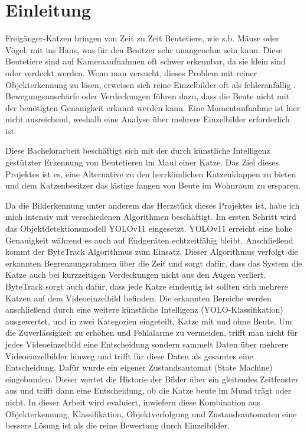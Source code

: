 \chapter{Einleitung}
\label{sec:einleitung}

Freigänger-Katzen bringen von Zeit zu Zeit Beutetiere, wie z.b. Mäuse oder Vögel, mit ins Haus, was für den Besitzer sehr unangenehm sein kann. Diese Beutetiere sind auf Kameraaufnahmen oft schwer erkennbar, da sie klein sind oder verdeckt werden. Wenn man versucht, dieses Problem mit reiner Objekterkennung zu lösen, erweisen sich reine Einzelbilder oft als fehleranfällig \cite{jiao2022video}. Bewegungsunschärfe oder Verdeckungen führen dazu, dass die Beute nicht mit der benötigten Genauigkeit erkannt werden kann. Eine Momentaufnahme ist hier nicht ausreichend, weshalb eine Analyse über mehrere Einzelbilder erforderlich ist.

Diese Bachelorarbeit beschäftigt sich mit der durch künstliche Intelligenz gestützter Erkennung von Beutetieren im Maul einer Katze. Das Ziel dieses Projektes ist es, eine Alternative zu den herrkömlichen Katzenklappen zu bieten und dem Katzenbesitzer das lästige fangen von Beute im Wohnraum zu ersparen.

Da die Bilderkennung unter anderem das Herzstück dieses Projektes ist, habe ich mich intensiv mit verschiedenen Algorithmen beschäftigt. Im ersten Schritt wird das Objektdetektionsmodell YOLOv11 \cite{jocher2024yolo} eingesetzt. YOLOv11 erreicht eine hohe Genauigkeit während es auch auf Endgeräten echtzeitfähig bleibt. Anschließend kommt der ByteTrack \cite{zhang2022bytetrack} Algorithmus zum Einsatz. Dieser Algorithmus verfolgt die erkannten Begrenzungsrahmen über die Zeit und sorgt dafür, dass das System die Katze auch bei kurzzeitigen Verdeckungen nicht aus den Augen verliert. ByteTrack sorgt auch dafür, dass jede Katze eindeutig ist sollten sich mehrere Katzen auf dem Videoeinzelbild befinden. Die erkannten Bereiche werden anschließend durch eine weitere künstliche Intelligenz (YOLO-Klassifikation) ausgewertet, und in zwei Kategorien eingeteilt, Katze mit und ohne Beute. Um die Zuverlässigkeit zu erhöhen und Fehlalarme zu vermeiden, trifft man nicht für jedes Videoeinzelbild eine Entscheidung sondern sammelt Daten über mehrere Videoeinzelbilder hinweg und trifft für diese Daten als gesamtes eine Entscheidung. Dafür wurde ein eigener Zustandsautomat (State Machine) eingebunden. Dieser wertet die Historie der Bilder über ein gleitendes Zeitfenster aus und trifft dann eine Entscheidung, ob die Katze beute im Mund trägt oder nicht. In dieser Arbeit wird evaluiert, inwiefern diese Kombination aus Objekterkennung, Klassifikation, Objektverfolgung und Zustandsautomaten eine bessere Lösung ist als die reine Bewertung durch Einzelbilder.
